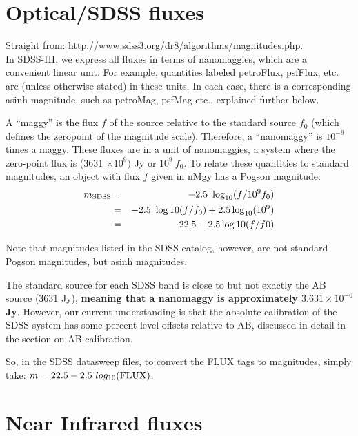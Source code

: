 \documentclass[11pt,a4paper]{article}
\begin{document}
\section{Optical/SDSS fluxes}
Straight from: \href{http://www.sdss3.org/dr8/algorithms/magnitudes.php}{http://www.sdss3.org/dr8/algorithms/magnitudes.php}.\\

In SDSS-III, we express all fluxes in terms of nanomaggies, which are
a convenient linear unit. For example, quantities labeled petroFlux,
psfFlux, etc. are (unless otherwise stated) in these units. In each
case, there is a corresponding asinh magnitude, such as petroMag,
psfMag etc., explained further below.

A ``maggy'' is the flux $f$ of the source relative to the standard
source $f_{0}$ (which defines the zeropoint of the magnitude
scale). Therefore, a ``nanomaggy'' is $10^{-9}$ times a maggy. These
fluxes are in a unit of nanomaggies, a system where the zero-point
flux is (3631 $\times10^{9})$ Jy or $10^{9}\ f_{0}$. To relate these
quantities to standard magnitudes, an object with flux $f$ given in
nMgy has a Pogson magnitude:
\begin{eqnarray}
m_{\rm SDSS} & = &  -2.5\ \log_{10} (f/10^{9}f_{0}) \\
    & = &  -2.5\ \log10(f/f_{0}) + 2.5 \log_{10}(10^{9}) \\
    & = &   22.5 - 2.5 \log 10(f/f0) \\
\end{eqnarray}

Note that magnitudes listed in the SDSS catalog, however, are not
standard Pogson magnitudes, but asinh magnitudes.

The standard source for each SDSS band is close to but not exactly the
AB source (3631 Jy), {\bf meaning that a nanomaggy is approximately
$3.631\times10^{-6}$ Jy}. However, our current understanding is that the absolute
calibration of the SDSS system has some percent-level offsets relative
to AB, discussed in detail in the section on AB calibration.

So, in the SDSS datasweep files, to convert the FLUX tags to magnitudes, simply take:
$ m = 22.5 - 2.5\ log_{10}({\rm FLUX})$.

\section{Near Infrared fluxes}
\end{document}
